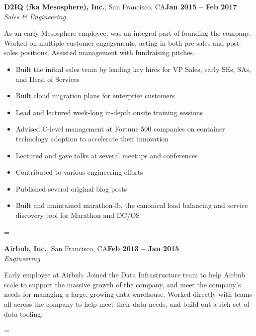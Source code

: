 \documentclass[margin,line]{resume}
\newenvironment{absolutelynopagebreak}
  {\par\nobreak\vfil\penalty0\vfilneg
   \vtop\bgroup}
  {\par\xdef\tpd{\the\prevdepth}\egroup
   \prevdepth=\tpd}
\begin{document}
\begin{resume}
    \vspace{5mm}

    \begin{absolutelynopagebreak}
    \textbf{D2IQ (fka Mesosphere), Inc.}, San Francisco, CA\hfill \textbf{Jan 2015 -- Feb 2017}\vspace{2mm}\\\vspace{1mm}%
    \textsl{Sales \& Engineering}

    As an early Mesosphere employee, was an integral part of founding the
    company.  Worked on multiple customer engagements, acting in both pre-sales
    and post-sales positions. Assisted management with fundraising pitches.

    \begin{itemize}
        \item Built the initial sales team by leading key hires for VP Sales,
        early SEs, SAs, and Head of Services
        \item Built cloud migration plans for enterprise customers
        \item Lead and lectured week-long in-depth onsite training sessions
        \item Advised C-level management at Fortune 500 companies on container
        technology adoption to accelerate their innovation
        \item Lectured and gave talks at several meetups and conferences
        \item Contributed to various engineering efforts
        \item Published several original blog posts
        \item Built and maintained marathon-lb, the canonical load balancing and
        service discovery tool for Marathon and DC/OS
    \end{itemize}
    \end{absolutelynopagebreak}

    \vspace{5mm}

    \begin{absolutelynopagebreak}
    \textbf{Airbnb, Inc.}, San Francisco, CA\hfill \textbf{Feb 2013 -- Jan 2015}\vspace{2mm}\\\vspace{1mm}%
    \textsl{Engineering}

    Early employee at Airbnb. Joined the Data Infrastructure team to help
    Airbnb scale to support the massive growth of the company, and meet the
    company's needs for managing a large, growing data warehouse. Worked
    directly with teams all across the company to help meet their data needs,
    and build out a rich set of data tooling.


\end{absolutelynopagebreak}
\end{resume}
\end{document}
